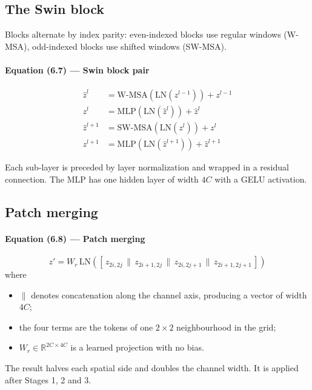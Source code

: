 \documentclass[12pt]{article}
\begin{document}
\subsection{The Swin block}

Blocks alternate by index parity: even-indexed blocks use regular windows (W-MSA), odd-indexed blocks use shifted windows (SW-MSA).

\paragraph{Equation (6.7) --- Swin block pair}
\begin{align}
\hat{z}^l &= \mathrm{W\text{-}MSA}(\mathrm{LN}(z^{l-1})) + z^{l-1} \\
z^l &= \mathrm{MLP}(\mathrm{LN}(\hat{z}^l)) + \hat{z}^l \\
\hat{z}^{l+1} &= \mathrm{SW\text{-}MSA}(\mathrm{LN}(z^l)) + z^l \\
z^{l+1} &= \mathrm{MLP}(\mathrm{LN}(\hat{z}^{l+1})) + \hat{z}^{l+1}
\end{align}

Each sub-layer is preceded by layer normalization and wrapped in a residual connection. The MLP has one hidden layer of width $4C$ with a GELU activation.

\subsection{Patch merging}

\paragraph{Equation (6.8) --- Patch merging}
\begin{equation}
z' = W_r\, \mathrm{LN}\left(\left[\, z_{2i,2j} \,\|\, z_{2i+1,2j} \,\|\, z_{2i,2j+1} \,\|\, z_{2i+1,2j+1} \,\right]\right)
\end{equation}
where
\begin{itemize}[nosep]
\item $\|$ denotes concatenation along the channel axis, producing a vector of width $4C$;
\item the four terms are the tokens of one $2\times2$ neighbourhood in the grid;
\item $W_r \in \mathbb{R}^{2C\times4C}$ is a learned projection with no bias.
\end{itemize}

The result halves each spatial side and doubles the channel width. It is applied after Stages 1, 2 and 3.
\end{document}
